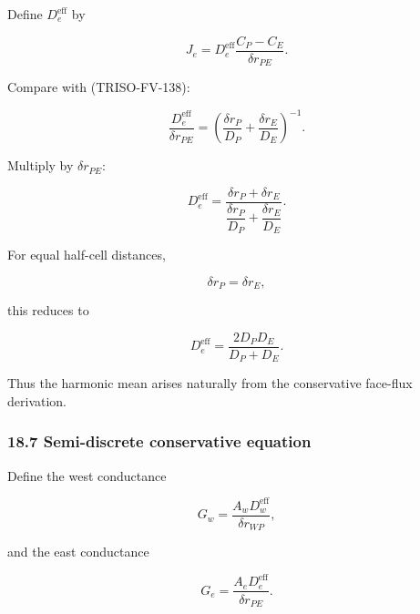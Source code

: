 \documentclass[11pt,a4paper]{article}
\begin{document}
Define $D_e^{\mathrm{eff}}$ by

\begin{equation}
J_e
=
D_e^{\mathrm{eff}}
\frac{C_P-C_E}{\delta r_{PE}}.
\tag{TRISO-FV-142}
\label{eq:triso-fv-142}
\end{equation}

Compare with (TRISO-FV-138):

\begin{equation}
\frac{D_e^{\mathrm{eff}}}{\delta r_{PE}}
=
\left(
\frac{\delta r_P}{D_P}
+
\frac{\delta r_E}{D_E}
\right)^{-1}.
\tag{TRISO-FV-143}
\label{eq:triso-fv-143}
\end{equation}

Multiply by $\delta r_{PE}$:

\begin{equation}
\boxed{
D_e^{\mathrm{eff}}
=
\frac{
\delta r_P+\delta r_E
}{
\dfrac{\delta r_P}{D_P}
+
\dfrac{\delta r_E}{D_E}
}.
}
\tag{TRISO-FV-144}
\label{eq:triso-fv-144}
\end{equation}

For equal half-cell distances,

\begin{equation}
\delta r_P=\delta r_E,
\tag{TRISO-FV-145}
\label{eq:triso-fv-145}
\end{equation}

this reduces to

\begin{equation}
\boxed{
D_e^{\mathrm{eff}}
=
\frac{2D_PD_E}{D_P+D_E}.
}
\tag{TRISO-FV-146}
\label{eq:triso-fv-146}
\end{equation}

Thus the harmonic mean arises naturally from the conservative face-flux derivation.

\subsubsection*{18.7 Semi-discrete conservative equation}

Define the west conductance

\begin{equation}
G_w
=
\frac{A_wD_w^{\mathrm{eff}}}{\delta r_{WP}},
\tag{TRISO-FV-147}
\label{eq:triso-fv-147}
\end{equation}

and the east conductance

\begin{equation}
G_e
=
\frac{A_eD_e^{\mathrm{eff}}}{\delta r_{PE}}.
\tag{TRISO-FV-148}
\label{eq:triso-fv-148}
\end{equation}
\end{document}
